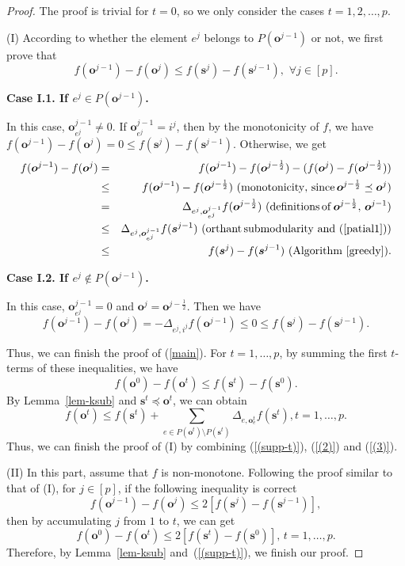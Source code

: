 \documentclass[preprint,12pt]{elsarticle}
\newcommand{\be}{\begin{equation}}
\newcommand{\ee}{\end{equation}}
\def\bea{\begin{eqnarray}}
\def\eea{\end{eqnarray}}
\def\nn{\nonumber}
\def\bo{\boldsymbol{o}}
\def\bs{\boldsymbol{s}}
\begin{document}
\begin{proof}
The proof is trivial for $t=0$, so we only consider the cases $t=1,2,\ldots,p$.

(I) According to whether the element $e^j$ belongs to $P(\bo^{j-1})$ or not,
we first prove that
\be\label{main}
f(\bo^{j-1})-f(\bo^j) \le f(\bs^j)-f(\bs^{j-1}),  \,\,\forall j\in [p].
\ee

\textbf{Case I.1. If %
$e^j\in P(\bo^{j-1})$.} %

In this case, $\bo^{j-1}_{e^j}\ne0$. If $\bo^{j-1}_{e^j}=i^j$, then by the monotonicity of $f$, we have
$
f(\bo^{j-1})-f(\bo^j) = 0 \le f(\bs^j)-f(\bs^{j-1}).
$
Otherwise, we get
\bea%
f(\bo^{j-1})-f(\bo^j) &= & f(\bo^{j-1})-f(\bo^{j-\frac{1}{2}})-(f(\bo^{j})-f(\bo^{j-\frac{1}{2}}))\nn \\
&\leq& f(\bo^{j-1})-f(\bo^{j-\frac{1}{2}}) \,\,({\rm monotonicity,\, since}\,\bo^{j-\frac{1}{2}}\preceq\bo^{j}) \nn \\
&= & \Delta_{e^j,\bo^{j-1}_{e^j}} f(\bo^{j-\frac{1}{2}})\,\,{\rm (definitions\, of\,}\bo^{j-\frac{1}{2}},\,\bo^{j-1})\label{case1-5} \\
&\leq & \Delta_{e^j,\bo^{j-1}_{e^j}} f(\bs^{j-1}) \,\,({\rm orthant\, submodularity\,\, and}\,\,(\ref{patial1})) \label{case1-6}\\
&\leq & f(\bs^j)-f(\bs^{j-1}) \,\,{\rm (Algorithm~\ref{greedy})}\label{case1-7}.
\eea

\textbf{Case I.2. If %
$e^j\notin P(\bo^{j-1})$.} %

In this case, $\bo^{j-1}_{e^j}=0$ and $\bo^{j}=\bo^{j-\frac{1}{2}}$. Then we have
\[
f(\bo^{j-1})-f(\bo^j)= -\Delta_{e^j, i^j} f(\bo^{j-1}) \le 0\le f(\bs^j)-f(\bs^{j-1}).
\]

Thus, we can finish the proof of (\ref{main}). For $t=1, \dots, p$, by summing the first $t$-terms of these inequalities, we have
\begin{equation}\label{(2)}
f(\bo^0)-f(\bo^t) \le f(\bs^t)-f(\bs^0).
\end{equation}
By Lemma~\ref{lem-ksub} and $\bs^t\preceq \bo^t$, we can obtain
\begin{equation}\label{(3)}
f(\bo^t)\le f(\bs^t)+\sum_{e\in P(\bo^t)\setminus P(\bs^t)}\Delta_{e, \bo^t_e}f(\bs^t), t=1, \dots, p.
\end{equation}
Thus, we can finish the proof of (I) by combining (\ref{(supp-t)}), (\ref{(2)}) and (\ref{(3)}).

(II) In this part, assume that $f$ is non-monotone. Following the proof similar to that of (I), for $j\in [p]$, if the following inequality is correct
\begin{equation}\label{supp}
f(\bo^{j-1})-f(\bo^j) \le  2[f(\bs^j)-f(\bs^{j-1})],
\end{equation}
then by accumulating $j$ from $1$ to $t$, we can get
\[
f(\bo^0)-f(\bo^t)\le2[f(\bs^t)-f(\bs^0)], \, t=1, \dots, p.
\]
Therefore, by Lemma~\ref{lem-ksub} and~(\ref{(supp-t)}), we finish our proof.


\end{proof}
\end{document}
